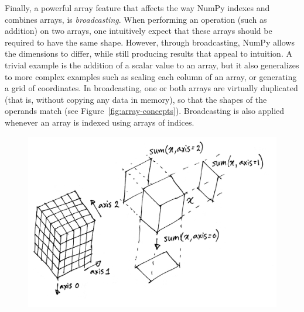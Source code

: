 
Finally, a powerful array feature that affects the way NumPy indexes and combines arrays, is {\em broadcasting}. When performing an operation (such as addition) on two arrays, one intuitively expect that these arrays should be required to have the same shape.  However, through broadcasting, NumPy allows the dimensions to differ, while still producing results that appeal to intuition.  A trivial example is the addition of a scalar value to an array, but it also generalizes to more complex examples such as scaling each column of an array, or generating a grid of coordinates.  In broadcasting, one or both arrays are virtually duplicated (that is, without copying any data in memory), so that the shapes of the operands match (see Figure~\ref{fig:array-concepts}).  Broadcasting is also applied whenever an array is indexed using arrays of indices.%


\begin{figure}
  \centering
  \includegraphics[width=\linewidth]{static/sketches/reductions}
  \caption{
   }
  \label{fig:reductions}
\end{figure}

